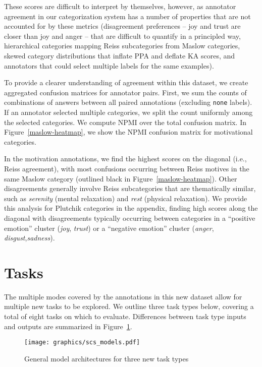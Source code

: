\documentclass[11pt,a4paper]{article}
\begin{document}
These scores are difficult to interpret by themselves, however, as annotator agreement in our categorization system has a number of properties that are not accounted for by these metrics  (disagreement preferences -- joy and trust are closer than joy and anger -- that are difficult to quantify in a principled way, hierarchical categories mapping Reiss subcategories from Maslow categories,  skewed category distributions that inflate PPA and deflate KA scores, and annotators that could select multiple labels for the same examples).

To provide a clearer understanding of agreement within this dataset, we create aggregated confusion matrices for annotator pairs.  First, we sum the counts of combinations of answers between all paired annotations (excluding \texttt{none} labels).  If an annotator selected multiple categories, we split the count uniformly among the selected categories.  We compute NPMI over the total confusion matrix.  In Figure~\ref{maslow-heatmap}, we show the NPMI confusion matrix for motivational categories.  

In the motivation annotations, we find the highest scores on the diagonal (i.e., Reiss agreement), with most confusions occurring between Reiss motives in the same Maslow category (outlined black in Figure~\ref{maslow-heatmap}).  Other disagreements generally involve Reiss subcategories that are thematically similar, such as \textit{serenity} (mental relaxation) and \textit{rest} (physical relaxation).  We provide this analysis for Plutchik categories in the appendix, finding high scores along the diagonal with disagreements typically occurring between categories in a ``positive emotion'' cluster (\textit{joy}, \textit{trust}) or a ``negative emotion'' cluster (\textit{anger}, \textit{disgust},\textit{sadness}).

%
 \section{Tasks}

The multiple modes covered by the annotations in this new dataset allow for multiple new tasks to be explored. We outline three task types below, covering a total of eight tasks on which to evaluate.  Differences between task type inputs and outputs are summarized in Figure~\ref{model-architecture}.

\begin{figure}
\begin{centering}
\texttt{[image: graphics/scs\_models.pdf]}
\caption{General model architectures for three new task types}
\label{model-architecture}
\end{centering}
\end{figure}
\end{document}
